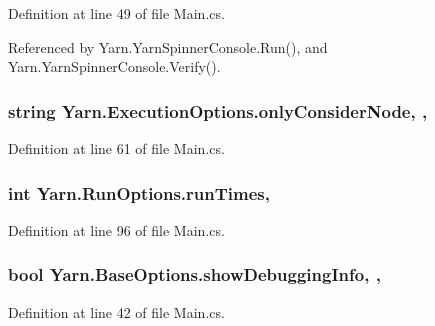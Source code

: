 Definition at line 49 of file Main.\-cs.



Referenced by Yarn.\-Yarn\-Spinner\-Console.\-Run(), and Yarn.\-Yarn\-Spinner\-Console.\-Verify().

\hypertarget{a00103_af4c0062a1d46281d377f87084fde374e}{
\subsubsection[{only\-Consider\-Node}]{\setlength{\rightskip}{0pt plus 5cm}string Yarn.\-Execution\-Options.\-only\-Consider\-Node\hspace{0.3cm}{\ttfamily [get]}, {\ttfamily [set]}, {\ttfamily [inherited]}}}\label{a00103_af4c0062a1d46281d377f87084fde374e}


Definition at line 61 of file Main.\-cs.

\hypertarget{a00157_a525bb1890b29f86002c2f163ace4a3d8}{
\subsubsection[{run\-Times}]{\setlength{\rightskip}{0pt plus 5cm}int Yarn.\-Run\-Options.\-run\-Times\hspace{0.3cm}{\ttfamily [get]}, {\ttfamily [set]}}}\label{a00157_a525bb1890b29f86002c2f163ace4a3d8}


Definition at line 96 of file Main.\-cs.

\hypertarget{a00041_a89964ea17bd19caf00cb5bff563ed01c}{
\subsubsection[{show\-Debugging\-Info}]{\setlength{\rightskip}{0pt plus 5cm}bool Yarn.\-Base\-Options.\-show\-Debugging\-Info\hspace{0.3cm}{\ttfamily [get]}, {\ttfamily [set]}, {\ttfamily [inherited]}}}\label{a00041_a89964ea17bd19caf00cb5bff563ed01c}


Definition at line 42 of file Main.\-cs.



